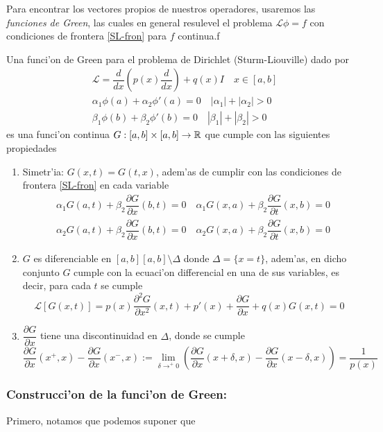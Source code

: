 \documentclass[main.tex]{subfiles}
\begin{document}
Para encontrar los vectores propios de nuestros operadores, usaremos las \emph{funciones de Green}, las cuales en general resulevel el problema $\mathcal{L}\phi=f$ con condiciones de frontera \ref{SL-fron} para $f$ continua.f\begin{def.}
  Una funci'on de Green para el problema de Dirichlet (Sturm-Liouville) dado por
\begin{align*}
  &\mathcal{L}=\dfrac{d}{dx}\left(p(x)\dfrac{d}{dx}\right)+q(x)I\quad x\in[a,b]\\
  &\alpha_{1}\phi(a)+\alpha_{2}\phi'(a)=0\quad|\alpha_{1}|+|\alpha_{2}|>0\\
  &\beta_{1}\phi(b)+\beta_{2}\phi'(b)=0\quad|\beta_{1}|+|\beta_{2}|>0
\end{align*}
es una funci'on continua $G:[a,b]\times[a,b]\to\mathbb R $ que cumple con las siguientes propiedades
\begin{enumerate}
\item Simetr'ia: $G(x,t)=G(t,x)$, adem'as de cumplir con las condiciones de frontera \ref{SL-fron} en cada variable
\begin{align*}\label{Green-fron}
  &\alpha_{1}G(a,t)+\beta_{2}\dfrac{\partial G}{\partial x}(b,t)=0\quad\alpha_{1}G(x,a)+\beta_{2}\dfrac{\partial G}{\partial t}(x,b)=0\\
  &\alpha_{2}G(a,t)+\beta_{2}\dfrac{\partial G}{\partial x}(b,t)=0\quad\alpha_{2}G(x,a)+\beta_{2}\dfrac{\partial G}{\partial t}(x,b)=0
\end{align*}
  \item $G$ es diferenciable en $[a,b][a,b]\setminus\Delta$ donde $\Delta=\{x=t\}$, adem'as, en dicho conjunto $G$ cumple con la ecuaci'on differencial en una de sus variables, es decir, para cada $t$ se cumple
  \[
    \mathcal{L}[G(x,t)]=p(x)\dfrac{\partial^{2} G}{\partial x^{2}}(x,t)+p'(x) + \dfrac{\partial G}{\partial x}+q(x)G(x,t)=0
  \]
  \item $\dfrac{\partial G}{\partial x}$ tiene una discontinuidad en $\Delta$, donde se cumple
        \begin{equation}
          \dfrac{\partial G}{\partial x}(x^{+},x)-\dfrac{\partial G}{\partial x}(x^{-},x):=\lim_{\delta\to^{+}0}\left(\dfrac{\partial G}{\partial x}(x+\delta,x)-\dfrac{\partial G}{\partial x}(x-\delta,x)\right)=\frac{1}{p(x)}
          \end{equation}
\end{enumerate}
\end{def.}
\subsubsection*{Construcci'on de la funci'on de Green:}
Primero, notamos que podemos suponer que
\end{document}
